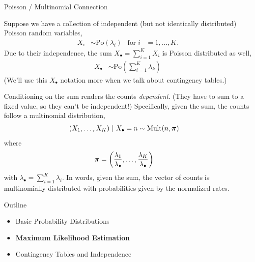 \documentclass[aspectratio=169]{beamer}
\begin{document}
\begin{frame}[t,allowframebreaks]{Poisson / Multinomial
Connection}\label{poisson-multinomial-connection}

Suppose we have a collection of independent (but not identically
distributed) Poisson random variables, \begin{align*}
X_i &\sim \mathrm{Po}(\lambda_i) & \text{for } i&=1,\ldots,K.
\end{align*} Due to their independence, the sum
\(X_\bullet = \sum_{i=1}^K X_i\) is Poisson distributed as well,
\begin{align*}
X_\bullet &\sim \mathrm{Po}\left( \sum_{i=1}^K \lambda_k \right)
\end{align*} (We'll use this \(X_\bullet\) notation more when we talk about contingency tables.)

Conditioning on the sum renders the counts \emph{dependent}. (They have
to sum to a fixed value, so they can't be independent!) Specifically,
given the sum, the counts follow a multinomial distribution,
\begin{align*}
(X_1, \ldots, X_K) ~\vert~ X_\bullet = n &\sim \mathrm{Mult}(n, \boldsymbol{\pi})
\end{align*} where \begin{align*}
\boldsymbol{\pi} &= \left(\frac{\lambda_1}{\lambda_\bullet}, \ldots, \frac{\lambda_K}{\lambda_\bullet} \right)
\end{align*} with \(\lambda_{\bullet} = \sum_{i=1}^K \lambda_i\). In
words, given the sum, the vector of counts is multinomially distributed
with probabilities given by the normalized rates.

\end{frame}

\begin{frame}{Outline}
  \begin{itemize}
    \item Basic Probability Distributions
    \item \textbf{Maximum Likelihood Estimation}
    \item Contingency Tables and Independence
  \end{itemize}
\end{frame}
\end{document}
